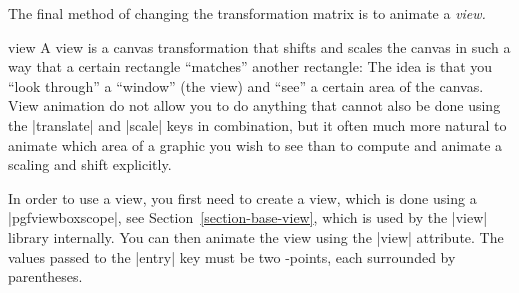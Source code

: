 The final method of changing the transformation matrix is to animate a
\emph{view.}

\begin{animateattribute}{view}
    A view is a canvas transformation that shifts and scales the canvas in such
    a way that a certain rectangle ``matches'' another rectangle: The idea is
    that you ``look through'' a ``window'' (the view) and ``see'' a certain
    area of the canvas. View animation do not allow you to do anything that
    cannot also be done using the |translate| and |scale| keys in combination,
    but it often much more natural to animate which area of a graphic you wish
    to see than to compute and animate a scaling and shift explicitly.

    In order to use a view, you first need to create a view, which is done
    using a |{pgfviewboxscope}|, see Section~\ref{section-base-view}, which is
    used by the |view| library internally. You can then animate the view using
    the |view| attribute. The values passed to the |entry| key must be two
    \pgfname-points, each surrounded by parentheses.
\begin{codeexample}[animation list={0.5,1,1.5,2},animation bb={(1.1,-0.9) rectangle (2.9,0.9)}]
\end{codeexample}

\begin{codeexample}[width=2cm]
\end{codeexample}
\end{animateattribute}
